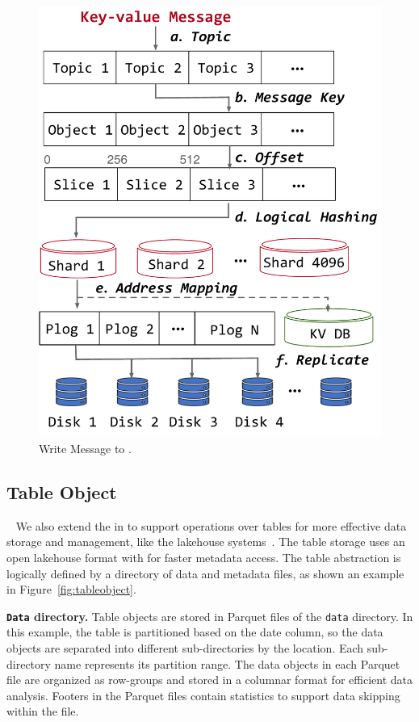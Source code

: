 \begin{figure}[htbp]	
	\includegraphics[scale=0.3]{figures/write}
	\centering
	\vspace{-1em}
	\caption{Write Message to \sys.}
	\label{fig:write}
	\vspace{-1em}
\end{figure}


\subsection{Table Object}~\label{subsec:tableobject}
We also extend the  in \sys to support operations over tables for more effective data storage and management, like the lakehouse systems~\cite{}. The table storage uses an open lakehouse format with  for faster metadata access. The table abstraction is logically defined by a directory of data and metadata files, as shown an example  in Figure~\ref{fig:tableobject}.

\noindent \textbf{\texttt{Data} directory.} Table objects are stored in Parquet files of the \texttt{data} directory. In this example, the table is partitioned based on the date column, so the data objects are separated into different sub-directories by the location. Each sub-directory name represents its partition range. The data objects in each Parquet file are organized as row-groups and stored in a columnar format for efficient data analysis. Footers in the Parquet files contain statistics to support data skipping within the file.





